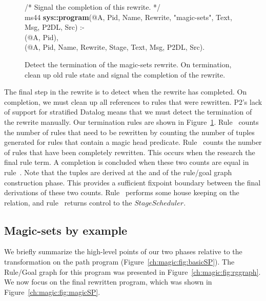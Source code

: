 \begin{figure}[!t]
\begin{boxedminipage}{\linewidth}
/* Signal the completion of this rewrite. */ \\
ms44 {\bf sys::program}(@A, Pid, Name, Rewrite, "magic-sets", Text, Msg, P2DL, Src) :- \\
(@A, Pid), \\
(@A, Pid, Name, Rewrite, Stage, Text, Msg, P2DL, Src).

\end{boxedminipage}
\caption{\label{ch:magic:fig:rewrite10} Detect the termination of the magic-sets rewrite. 
On termination, clean up old rule state and signal the completion of the rewrite.}
\end{figure}

The final step in the rewrite is to detect when the rewrite has completed.  On
completion, we must clean up all references to rules that were rewritten.  P2's
lack of support for stratified Datalog means that we must detect the
termination of the rewrite manually.  Our termination rules are shown in
Figure~\ref{ch:magic:fig:rewrite10}.  Rule~ counts the number of rules
that need to be rewritten by counting the number of  tuples
generated for rules that contain a magic head predicate.  Rule~ counts
the number of rules that have been completely rewritten.  This occurs when the
 research the final rule term.  A completion is concluded when
these two counts are equal in rule~.  Note that the
 tuples are derived at the and of the rule/goal graph
construction phase.  This provides a sufficient fixpoint boundary between the
final derivations of these two counts.  Rule~ performs some house
keeping on the  relation, and rule~ returns control to the
$StageScheduler$.

\subsection{Magic-sets by example}

We briefly summarize the high-level points of our two phases relative to the
transformation on the path program (Figure~\ref{ch:magic:fig:basicSP}).  The
Rule/Goal graph for this program was presented in
Figure~\ref{ch:magic:fig:rggraph}.  We now focus on the final rewritten
program, which was shown in Figure~\ref{ch:magic:fig:magicSP}.

